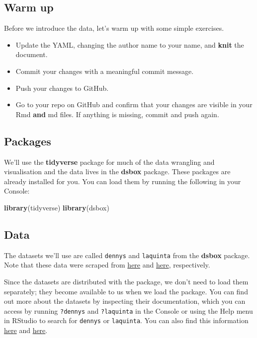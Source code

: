 \documentclass[
]{article}
\newenvironment{Shaded}{\begin{snugshade}}{\end{snugshade}}
\newcommand{\FunctionTok}[1]{\textcolor[rgb]{0.13,0.29,0.53}{\textbf{#1}}}
\newcommand{\NormalTok}[1]{#1}
\providecommand{\tightlist}{%
  \setlength{\itemsep}{0pt}\setlength{\parskip}{0pt}}
\begin{document}
\subsection{Warm up}\label{warm-up}

Before we introduce the data, let's warm up with some simple exercises.

\begin{itemize}
\tightlist
\item
  Update the YAML, changing the author name to your name, and
  \textbf{knit} the document.
\item
  Commit your changes with a meaningful commit message.
\item
  Push your changes to GitHub.
\item
  Go to your repo on GitHub and confirm that your changes are visible in
  your Rmd \textbf{and} md files. If anything is missing, commit and
  push again.
\end{itemize}

\subsection{Packages}\label{packages}

We'll use the \textbf{tidyverse} package for much of the data wrangling
and visualisation and the data lives in the \textbf{dsbox} package.
These packages are already installed for you. You can load them by
running the following in your Console:

\begin{Shaded}
\begin{Highlighting}[]
\FunctionTok{library}\NormalTok{(tidyverse) }
\FunctionTok{library}\NormalTok{(dsbox) }
\end{Highlighting}
\end{Shaded}

\subsection{Data}\label{data}

The datasets we'll use are called \texttt{dennys} and \texttt{laquinta}
from the \textbf{dsbox} package. Note that these data were scraped from
\href{https://locations.dennys.com/}{here} and
\href{https://www.lq.com/en/findandbook/hotel-listings.html}{here},
respectively.

Since the datasets are distributed with the package, we don't need to
load them separately; they become available to us when we load the
package. You can find out more about the datasets by inspecting their
documentation, which you can access by running \texttt{?dennys} and
\texttt{?laquinta} in the Console or using the Help menu in RStudio to
search for \texttt{dennys} or \texttt{laquinta}. You can also find this
information
\href{https://rstudio-education.github.io/dsbox/reference/dennys.html}{here}
and
\href{https://rstudio-education.github.io/dsbox/reference/laquinta.html}{here}.
\end{document}
